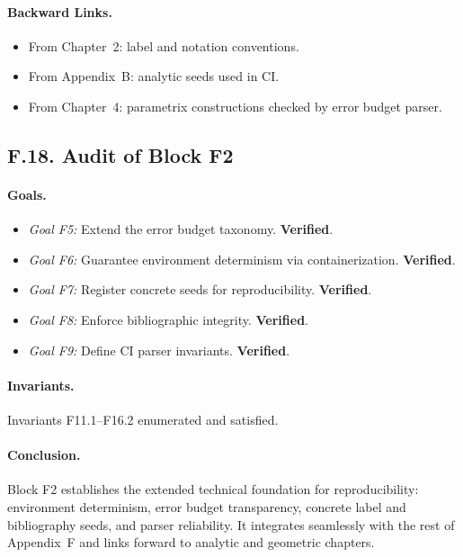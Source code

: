 \paragraph{Backward Links.}
\begin{itemize}
    \item From Chapter~2: label and notation conventions.
    \item From Appendix~B: analytic seeds used in CI.
    \item From Chapter~4: parametrix constructions checked by error budget parser.
\end{itemize}

\subsection*{F.18. Audit of Block F2}

\paragraph{Goals.}
\begin{itemize}
    \item \emph{Goal F5:} Extend the error budget taxonomy. \textbf{Verified}.
    \item \emph{Goal F6:} Guarantee environment determinism via containerization. \textbf{Verified}.
    \item \emph{Goal F7:} Register concrete seeds for reproducibility. \textbf{Verified}.
    \item \emph{Goal F8:} Enforce bibliographic integrity. \textbf{Verified}.
    \item \emph{Goal F9:} Define CI parser invariants. \textbf{Verified}.
\end{itemize}

\paragraph{Invariants.} Invariants F11.1–F16.2 enumerated and satisfied.

\paragraph{Conclusion.} Block F2 establishes the extended technical foundation for reproducibility: environment determinism, error budget transparency, concrete label and bibliography seeds, and parser reliability. It integrates seamlessly with the rest of Appendix~F and links forward to analytic and geometric chapters.

